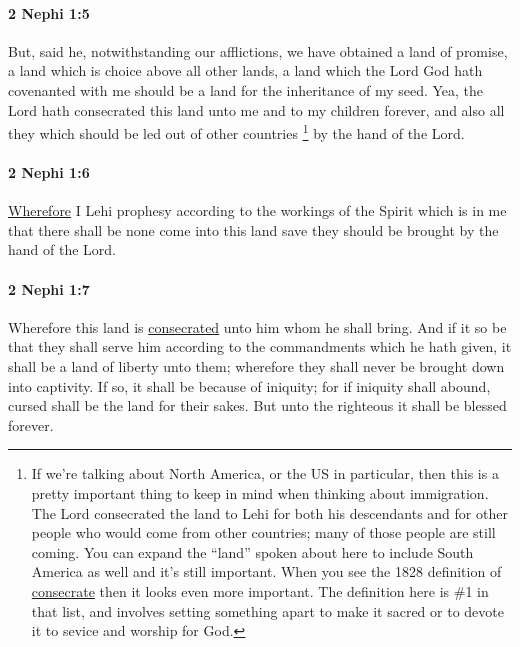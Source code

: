 		\paragraph{2 Nephi 1:5} %
			\label{2NEPHI-1-5}

			But, said he, notwithstanding our afflictions,
			we have obtained a land of promise,
			a land which is choice above all other lands,
			a land which the Lord God hath covenanted with me
			should be a land for the inheritance of my seed.
			Yea, the Lord hath consecrated this land unto me and to my children forever,
			and also all they which should be led out of other countries%
				\footnote{%
					\label{2NEPHI-1-5-countries}%
					If we're talking about North America, or the US in particular, then this is a pretty important thing to keep in mind when thinking about immigration. The Lord consecrated the land to Lehi for both his descendants and for other people who would come from other countries; many of those people are still coming. You can expand the ``land'' spoken about here to include South America as well and it's still important. When you see the 1828 definition of \hyperref[CONSECRATION-1828]{consecrate} then it looks even more important. The definition here is \#1 in that list, and involves setting something apart to make it sacred or to devote it to sevice and worship for God.
					}
			by the hand of the Lord.

		\paragraph{2 Nephi 1:6} %
			\label{2NEPHI-1-6}

			\hyperref[WHEREFORE-1828]{Wherefore} I Lehi prophesy
			according to the workings of the Spirit which is in me
			that there shall be none come into this land
			save they should be brought by the hand of the Lord.

		\paragraph{2 Nephi 1:7} %
			\label{2NEPHI-1-7}

			Wherefore this land is \hyperref[CONSECRATION-1828]{consecrated} unto him whom he shall bring.
			And if it so be that they shall serve him
			according to the commandments which he hath given,
			it shall be a land of liberty unto them;
			wherefore they shall never be brought down into captivity.
			If so, it shall be because of iniquity;
			for if iniquity shall abound,
			cursed shall be the land for their sakes.
			But unto the righteous it shall be blessed forever.

